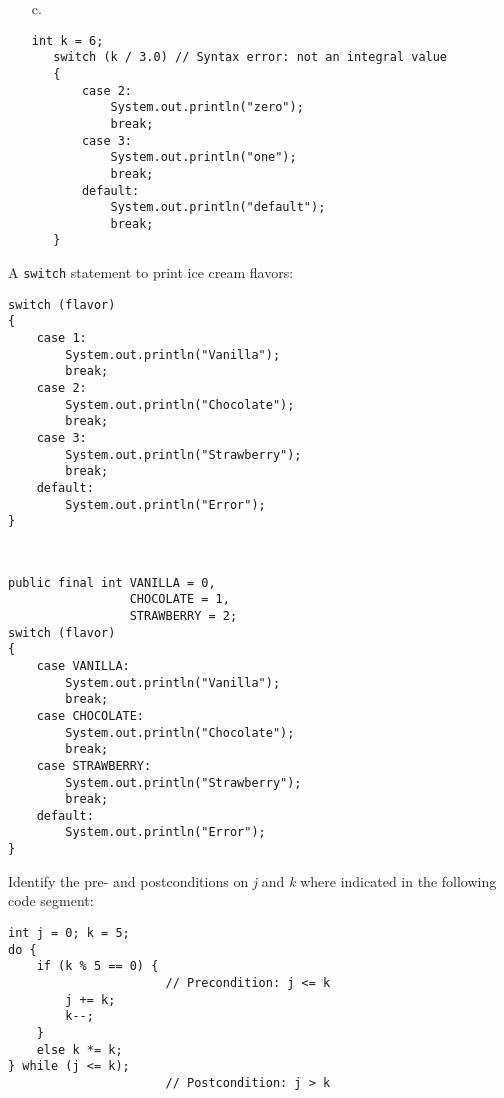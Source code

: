 \begin{ANS}
\begin{enumerate}
\item[c.]

\begin{jjjlisting}
\begin{lstlisting}[basicstyle=\scriptsize]
   int k = 6;
   switch (k / 3.0) // Syntax error: not an integral value
   {   
       case 2:
           System.out.println("zero");
           break;
       case 3:
           System.out.println("one");
           break;
       default:
           System.out.println("default");
           break;
   }
\end{lstlisting}
\end{jjjlisting}

\end{enumerate}

\item  A {\tt switch} statement to print ice cream flavors:
\verb| |

\begin{jjjlisting}
\begin{lstlisting}[basicstyle=\scriptsize]
switch (flavor) 
{   
    case 1:
        System.out.println("Vanilla");
        break;
    case 2:
        System.out.println("Chocolate");
        break;
    case 3:
        System.out.println("Strawberry");
        break;
    default:
        System.out.println("Error");
}
\end{lstlisting}
\end{jjjlisting}

\item  \verb| |

\begin{jjjlisting}
\begin{lstlisting}[basicstyle=\scriptsize]
public final int VANILLA = 0,
                 CHOCOLATE = 1,
                 STRAWBERRY = 2;
switch (flavor) 
{   
    case VANILLA:
        System.out.println("Vanilla");
        break;
    case CHOCOLATE:
        System.out.println("Chocolate");
        break;
    case STRAWBERRY:
        System.out.println("Strawberry");
        break;
    default:
        System.out.println("Error");
}
\end{lstlisting}
\end{jjjlisting}

\item  Identify the pre- and postconditions on {\it j} and {\it k} where indicated in
the following code segment:

\begin{jjjlisting}
\begin{lstlisting}[basicstyle=\scriptsize]
int j = 0; k = 5;
do {
    if (k % 5 == 0) {
                      // Precondition: j <= k
        j += k;
        k--;
    }
    else k *= k;
} while (j <= k);
                      // Postcondition: j > k
\end{lstlisting}
\end{jjjlisting}



\end{ANS}
